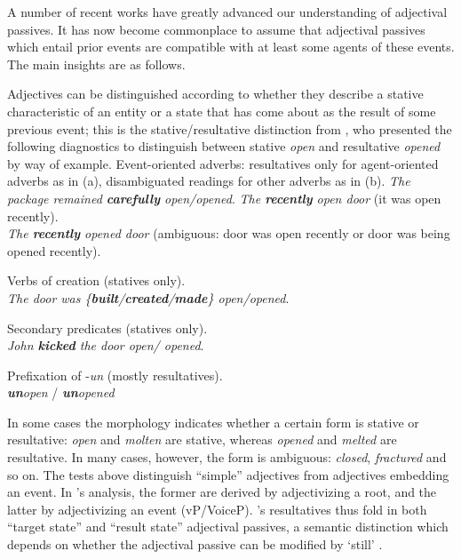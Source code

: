 A number of recent works have greatly advanced our understanding of adjectival passives. It has now become commonplace to assume that adjectival passives which entail prior events are compatible with at least some agents of these events. The main insights are as follows.

Adjectives can be distinguished according to whether they describe a stative characteristic of an entity or a state that has come about as the result of some previous event; this is the stative/resultative distinction from \cite{embick04li}, who presented the following diagnostics to distinguish between stative \emph{open} and resultative \emph{opened} by way of example.
\pex Event-oriented adverbs: resultatives only for agent-oriented adverbs as in (a), disambiguated readings for other adverbs as in (b).
	\a \emph{The package remained \textbf{carefully} \xmark open/\cmark opened}.
	\a \emph{The \textbf{recently} open door} (it was open recently).\\
		\emph{The \textbf{recently} opened door} (ambiguous: door was open recently or door was being opened recently).
\xe

\ex Verbs of creation (statives only).\\
	\emph{The door was \{\textbf{built}/\textbf{created}/\textbf{made}\} \cmark open/\xmark opened}.
\xe

\ex Secondary predicates (statives only).\\
	\emph{John \textbf{kicked} the door \cmark open/ \xmark opened}.
\xe

\ex Prefixation of -\emph{un} (mostly resultatives).\\
	\xmark \emph{\textbf{un}open} / \cmark \emph{\textbf{un}opened}
\xe

In some cases the morphology indicates whether a certain form is stative or resultative: \emph{open} and \emph{molten} are stative, whereas \emph{opened} and \emph{melted} are resultative. In many cases, however, the form is ambiguous: \emph{closed}, \emph{fractured} and so on. The tests above distinguish ``simple'' adjectives from adjectives embedding an event. In \citeauthor{embick04li}'s analysis, the former are derived by adjectivizing a root, and the latter by adjectivizing an event (vP/VoiceP). \citeauthor{embick04li}'s resultatives thus fold in both ``target state'' and ``result state'' adjectival passives, a semantic distinction which depends on whether the adjectival passive can be modified by `still' \citep{kratzer00bls,alexiadouetal14}.

